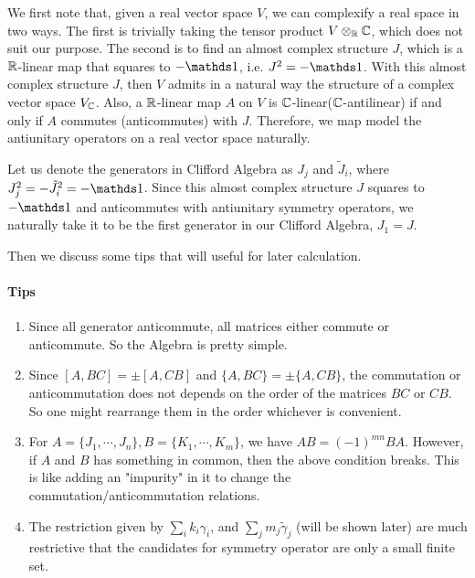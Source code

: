We first note that, given a real vector space $V$, we can complexify a real space in
two ways. The first is trivially taking the tensor product $V\otimes_{\mathbb{R}} \mathbb{C}$,
which does not suit our purpose. The second is to find an almost complex
structure $J$, which is a $\mathbb{R}$-linear map that squares to $-\id$, i.e.
$J^2=-\id$. With this almost complex structure $J$, then $V$ admits in a natural
way the structure of a complex vector space $V_{\mathbb{C}}$\cite{DanielHuybrechts2005}. Also, a
$\mathbb{R}$-linear map $A$ on $V$ is $\mathbb{C}$-linear($\mathbb{C}$-antilinear) if and only if $A$
commutes (anticommutes) with $J$. Therefore, we map model the antiunitary
operators on a real vector space naturally.

Let us denote the generators in Clifford Algebra as $J_j$ and $\tilde{J}_i$,
where $J_j^2=-\tilde{J}_i^2 =-\id$. Since this almost complex structure $J$
squares to $-\id$ and anticommutes with antiunitary symmetry operators, we
naturally take it to be the first generator in our Clifford Algebra, $J_1=J$.

Then we discuss some tips that will useful for later calculation.
\paragraph{Tips}
\begin{enumerate}
    \item Since all generator anticommute, all matrices either commute or
        anticommute. So the Algebra is pretty simple.
    \item Since $[A,BC] = \pm[A,CB]$ and $\{A,BC\}=\pm\{A,CB\}$, the commutation
        or anticommutation does not depends on the order of the matrices $BC$ or
        $CB$. So one might rearrange them in the order whichever is convenient.
    \item For $A=\{J_1,\cdots,J_n\},B=\{K_1,\cdots,K_m\}$, we have $AB=(-1)^{mn}
        BA$. However, if $A$ and $B$ has something in common, then the above
        condition breaks. This is like adding an "impurity" in it to change the
        commutation/anticommutation relations.
    \item The restriction given by $\sum_i k_i \gamma_i$, and $\sum_j m_j
        \tilde{\gamma}_j$ (will be shown later) are much restrictive that the
        candidates for symmetry operator are only a small finite set.
        \label{enum:tips-4}
\end{enumerate}

